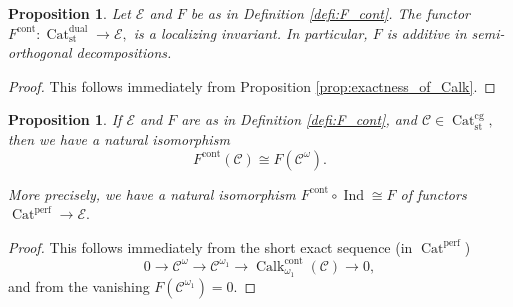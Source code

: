 \documentclass[11pt,leqno]{amsart}
\newtheorem{prop}[theo]{Proposition}
\numberwithin{equation}{section}
\newcommand{\xto}{\xrightarrow}
\newcommand{\hto}{\hookrightarrow}
\newcommand{\Cat}{\operatorname{Cat}}
\newcommand{\cont}{\operatorname{cont}}
\newcommand{\st}{\operatorname{st}}
\newcommand{\cg}{\operatorname{cg}}
\newcommand{\dual}{\operatorname{dual}}
\newcommand{\cC}{{\mathcal C}}
\newcommand{\cE}{{\mathcal E}}
\newcommand{\perf}{\operatorname{perf}}
\newcommand{\Ind}{\operatorname{Ind}}
\newcommand{\Calk}{\operatorname{Calk}}
\begin{document}

\begin{prop}\label{prop:F_cont_is_loc}Let $\cE$ and $F$ be as in Definition \ref{defi:F_cont}. The functor $F^{\cont}:\Cat_{\st}^{\dual}\to\cE,$ is a localizing invariant. In particular, $F$ is additive in semi-orthogonal decompositions.\end{prop}

\begin{proof}This follows immediately from Proposition \ref{prop:exactness_of_Calk}.\end{proof}


\begin{prop}\label{prop:F_cont_of_cg} If $\cE$ and $F$ are as in Definition \ref{defi:F_cont}, and $\cC\in\Cat_{\st}^{\cg},$ then we have a natural isomorphism $$F^{\cont}(\cC)\cong F(\cC^{\omega}).$$

More precisely, we have a natural isomorphism $F^{\cont}\circ\Ind\cong F$ of functors $\Cat^{\perf}\to\cE.$\end{prop}

\begin{proof}
This follows immediately from the short exact sequence (in $\Cat^{\perf}$)
$$0\to\cC^{\omega}\to \cC^{\omega_1}\to \Calk_{\omega_1}^{\cont}(\cC)\to 0,$$
and from the vanishing $F(\cC^{\omega_1})=0.$
\end{proof}
\end{document}
